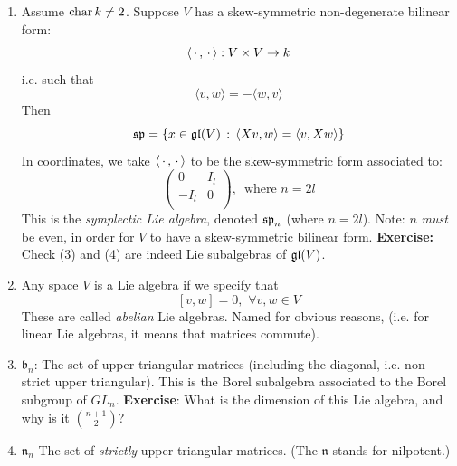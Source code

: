 \documentclass{article}
\begin{document}
\begin{enumerate}
    \item[(d)] Assume $\operatorname{char} k \neq 2$. Suppose $V$ has a skew-symmetric non-degenerate bilinear form: \[ \langle \, \cdot \,, \, \cdot \, \rangle: V \times V \to k\]
    i.e. such that
    \[ \langle v, w \rangle = - \langle w, v\rangle\]
    Then \[
    \mathfrak{sp} = \{ x \in \mathfrak{gl}(V) \, : \, \langle Xv,w \rangle = \langle v, Xw \rangle \} \]
    In coordinates, we take $\langle \, \cdot \,, \, \cdot \, \rangle$ to be the skew-symmetric form associated to: \[
    \begin{pmatrix}
        0 & I_{l}\\
        -I_{l} & 0\\
    \end{pmatrix}, \, \, \, \text{where $n=2l$}\]
    This is the \textit{symplectic Lie algebra}, denoted $\mathfrak{sp}_{n}$ (where $n=2l$). \gap
    Note: $n$ \textit{must} be even, in order for $V$ to have a skew-symmetric bilinear form. \gap
    \textbf{Exercise:} Check (3) and (4) are indeed Lie subalgebras of $\mathfrak{gl}(V)$. \\
    \item[(e)] Any space $V$ is a Lie algebra if we specify that \[ [v,w]=0, \, \, \forall v,w \in V \]
    These are called \textit{abelian} Lie algebras. Named for obvious reasons, (i.e. for linear Lie algebras, it means that matrices commute).
    \item[(f)]$\mathfrak{b}_{n}$: The set of upper triangular matrices (including the diagonal, i.e. non-strict upper triangular). This is the Borel subalgebra associated to the Borel subgroup of $GL_{n}$. \gap \textbf{Exercise}: What is the dimension of this Lie algebra, and why is it $\binom{n+1}{2}$?
    \item[(g)] $\mathfrak{n}_{n}$ The set of \textit{strictly} upper-triangular matrices. (The $\mathfrak{n}$ stands for nilpotent.)
\end{enumerate}
\end{document}
